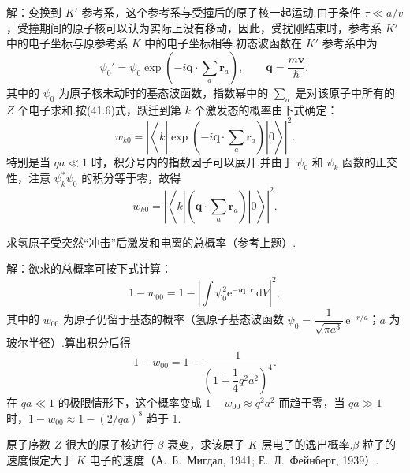 \begin{xiti}
解：变换到 $K'$ 参考系，这个参考系与受撞后的原子核一起运动.由于条件 $\tau\ll a/v$，受撞期间的原子核可以认为实际上没有移动，因此，受扰刚结束时，参考系 $K'$ 中的电子坐标与原参考系 $K$ 中的电子坐标相等.初态波函数在 $K'$ 参考系中为
\begin{equation*}
  \psi_0'=\psi_0\exp\left(-i\boldsymbol{q}\cdot\sum_a\boldsymbol{r}_a\right),
  \qquad\boldsymbol{q}=\frac{m\boldsymbol{v}}{\hbar},
\end{equation*}
其中的 $\psi_0$ 为原子核未动时的基态波函数，指数幂中的 $\sum_a$ 是对该原子中所有的 $Z$ 个电子求和.按(41.6)式，跃迁到第 $k$ 个激发态的概率由下式确定：
\begin{equation*}
  w_{k0}=\left|\left\langle k\left|
  \exp\left(-i\boldsymbol{q}\cdot\sum_a\boldsymbol{r}_a\right)
  \right|0\right\rangle\right|^2.
\end{equation*}
特别是当 $qa\ll1$ 时，积分号内的指数因子可以展开.并由于 $\psi_0$ 和 $\psi_k$ 函数的正交性，注意 $\psi_k^{*}\psi_0$ 的积分等于零，故得
\begin{equation*}
  w_{k0}=\left|\left\langle k\left|
  \left(\boldsymbol{q}\cdot\sum_a\boldsymbol{r}_a\right)
  \right|0\right\rangle\right|^2.
\end{equation*}

\quad 求氢原子受突然“冲击”后激发和电离的总概率（参考上题）.

解：欲求的总概率可按下式计算：
\begin{equation*}
  1-w_{00}=1-\left|\int\psi_0^2\mathrm{e}^{-i\boldsymbol{q}\cdot\boldsymbol{r}}\,\mathrm{d}V\right|^2,
\end{equation*}
其中的 $w_{00}$ 为原子仍留于基态的概率（氢原子基态波函数
$\psi_0=\dfrac{1}{\sqrt{\pi a^3}}\,\mathrm{e}^{-r/a}$；$a$ 为玻尔半径）.算出积分后得
\begin{equation*}
  1-w_{00}=1-\frac{1}{\left(1+\dfrac{1}{4}q^2a^2\right)^4}.
\end{equation*}
在 $qa\ll1$ 的极限情形下，这个概率变成 $1-w_{00}\approx q^2a^2$ 而趋于零，当 $qa\gg1$ 时，$1-w_{00}\approx1-\left(2/qa\right)^8$ 趋于 1.

\quad 原子序数 $Z$ 很大的原子核进行 $\beta$ 衰变，求该原子 $K$ 层电子的逸出概率.$\beta$ 粒子的速度假定大于 $K$ 电子的速度（А.~Б.~Мигдал, 1941; Е.~Л.~Фейнберг, 1939）.


\end{xiti}

